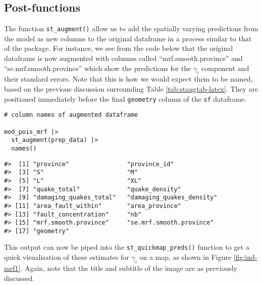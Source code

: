 \hypertarget{post-functions-1}{%
\subsection{Post-functions}\label{post-functions-1}}

The function \texttt{st\_augment()} allow us to add the spatially varying predictions from the model as new columns to the original dataframe in a process
similar to that of the  package. For instance, we see from the code below that the original dataframe is now augmented with columns called ``mrf.smooth.province'' and ``se.mrf.smooth.province'' which show the predictions for the \(\gamma_i\) component and their standard errors. Note that this is how we would expect them to be named, based on the previous discussion surrounding Table \ref{tab:staugtab-latex}. They are positioned immediately before the final \texttt{geometry} column of the \texttt{sf} dataframe.

\begin{verbatim}
# column names of augmented dataframe

mod_pois_mrf |> 
  st_augment(prep_data) |> 
  names()
\end{verbatim}

\begin{verbatim}
#>  [1] "province"                "province_id"            
#>  [3] "S"                       "M"                      
#>  [5] "L"                       "XL"                     
#>  [7] "quake_total"             "quake_density"          
#>  [9] "damaging_quakes_total"   "damaging_quakes_density"
#> [11] "area_fault_within"       "area_province"          
#> [13] "fault_concentration"     "nb"                     
#> [15] "mrf.smooth.province"     "se.mrf.smooth.province" 
#> [17] "geometry"
\end{verbatim}

This output can now be piped into the \texttt{st\_quickmap\_preds()} function to get a quick visualisation of
these estimates for \(\gamma_i\) on a map, as shown in Figure \ref{fig:ind-mrf1}. Again, note that the title and subtitle of the image are as previously discussed.



